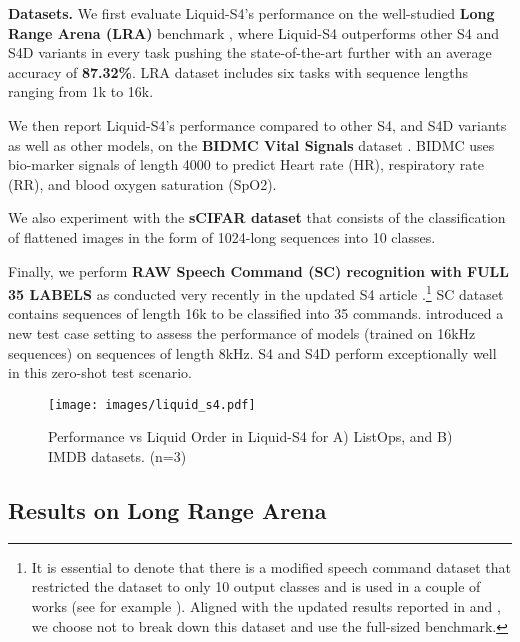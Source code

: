 \documentclass{MITcsail}
\begin{document}
\noindent\textbf{Datasets.} We first evaluate Liquid-S4's performance on the well-studied \textbf{Long Range Arena (LRA)} benchmark \citep{tay2020long}, where Liquid-S4 outperforms other S4 and S4D variants in every task pushing the state-of-the-art further with an average accuracy of \textbf{87.32\%}. LRA dataset includes six tasks with sequence lengths ranging from 1k to 16k. 

We then report Liquid-S4's performance compared to other S4, and S4D variants as well as other models, on the \textbf{BIDMC Vital Signals} dataset \citep{pimentel2016toward,goldberger2000physiobank}. BIDMC uses bio-marker signals of length 4000 to predict Heart rate (HR), respiratory rate (RR), and blood oxygen saturation (SpO2). 

We also experiment with the \textbf{sCIFAR dataset} that consists of the classification of flattened images in the form of 1024-long sequences into 10 classes.

Finally, we perform \textbf{RAW Speech Command (SC) recognition with FULL 35 LABELS} as conducted very recently in the updated S4 article \citep{gu2022efficiently}.\footnote{It is essential to denote that there is a modified speech command dataset that restricted the dataset to only 10 output classes and is used in a couple of works (see for example \protect\citep{kidger2020neural,gu2021combining,romero2021ckconv,romero2021flexconv}). Aligned with the updated results reported in \citep{gu2022efficiently} and \citep{gu2022parameterization}, we choose not to break down this dataset and use the full-sized benchmark.} SC dataset contains sequences of length 16k to be classified into 35 commands. \citet{gu2022efficiently} introduced a new test case setting to assess the performance of models (trained on 16kHz sequences) on sequences of length 8kHz. S4 and S4D perform exceptionally well in this zero-shot test scenario.

\begin{figure}[t]
    \centering
    \texttt{[image: images/liquid\_s4.pdf]}
    \caption{Performance vs Liquid Order in Liquid-S4 for A) ListOps, and B) IMDB datasets. (n=3)}
    \label{fig:liquid_order}
\end{figure}

\subsection{Results on Long Range Arena}
\end{document}
